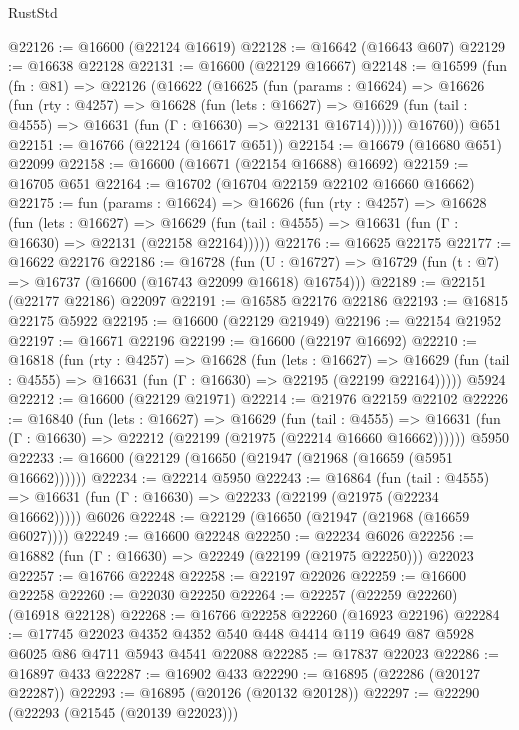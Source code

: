 \begin{lexlean}{RustStd}
\begin{coremodule}
{\begin{coremodule}
{{{{{{{{{{{{{{{{{{{{{{{{{{{{{{{{{{{{{{{{{{{{{{{{{{{{{{{@22126 := @16600 (@22124 @16619)
@22128 := @16642 (@16643 @607)
@22129 := @16638 @22128
@22131 := @16600 (@22129 @16667)
@22148 := @16599
    (fun (fn : @81) =>
    @22126
      (@16622
        (@16625
          (fun (params : @16624) =>
          @16626
            (fun (rty : @4257) =>
            @16628
              (fun (lets : @16627) =>
              @16629 (fun (tail : @4555) => @16631 (fun (Γ : @16630) => @22131 @16714))))))
        @16760))
    @651
@22151 := @16766 (@22124 (@16617 @651))
@22154 := @16679 (@16680 @651) @22099
@22158 := @16600 (@16671 (@22154 @16688) @16692)
@22159 := @16705 @651
@22164 := @16702 (@16704 @22159 @22102 @16660 @16662)
@22175 := fun (params : @16624) =>
  @16626
    (fun (rty : @4257) =>
    @16628
      (fun (lets : @16627) =>
      @16629 (fun (tail : @4555) => @16631 (fun (Γ : @16630) => @22131 (@22158 @22164)))))
@22176 := @16625 @22175
@22177 := @16622 @22176
@22186 := @16728
    (fun (U : @16727) => @16729 (fun (t : @7) => @16737 (@16600 (@16743 @22099 @16618) @16754)))
@22189 := @22151 (@22177 @22186) @22097
@22191 := @16585 @22176 @22186
@22193 := @16815 @22175 @5922
@22195 := @16600 (@22129 @21949)
@22196 := @22154 @21952
@22197 := @16671 @22196
@22199 := @16600 (@22197 @16692)
@22210 := @16818
    (fun (rty : @4257) =>
    @16628
      (fun (lets : @16627) =>
      @16629 (fun (tail : @4555) => @16631 (fun (Γ : @16630) => @22195 (@22199 @22164)))))
    @5924
@22212 := @16600 (@22129 @21971)
@22214 := @21976 @22159 @22102
@22226 := @16840
    (fun (lets : @16627) =>
    @16629
      (fun (tail : @4555) =>
      @16631 (fun (Γ : @16630) => @22212 (@22199 (@21975 (@22214 @16660 @16662))))))
    @5950
@22233 := @16600 (@22129 (@16650 (@21947 (@21968 (@16659 (@5951 @16662))))))
@22234 := @22214 @5950
@22243 := @16864
    (fun (tail : @4555) => @16631 (fun (Γ : @16630) => @22233 (@22199 (@21975 (@22234 @16662)))))
    @6026
@22248 := @22129 (@16650 (@21947 (@21968 (@16659 @6027))))
@22249 := @16600 @22248
@22250 := @22234 @6026
@22256 := @16882 (fun (Γ : @16630) => @22249 (@22199 (@21975 @22250))) @22023
@22257 := @16766 @22248
@22258 := @22197 @22026
@22259 := @16600 @22258
@22260 := @22030 @22250
@22264 := @22257 (@22259 @22260) (@16918 @22128)
@22268 := @16766 @22258 @22260 (@16923 @22196)
@22284 := @17745
    @22023
    @4352
    @4352
    @540
    @448
    @4414
    @119
    @649
    @87
    @5928
    @6025
    @86
    @4711
    @5943
    @4541
    @22088
@22285 := @17837 @22023
@22286 := @16897 @433
@22287 := @16902 @433
@22290 := @16895 (@22286 (@20127 @22287))
@22293 := @16895 (@20126 (@20132 @20128))
@22297 := @22290 (@22293 (@21545 (@20139 @22023)))
}}}}}}}}}}}}}}}}}}}}}}}}}}}}}}}}}}}}}}}}}}}}}}}}}}}}}}}
\end{coremodule}}
\end{coremodule}
\end{lexlean}
